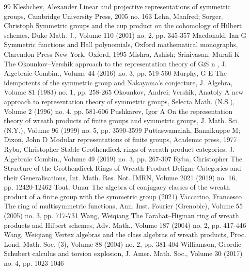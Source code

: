 \documentclass[10pt]{article}
\theoremstyle{definition}
\begin{document}
\begin{thebibliography}{99}
Kleshchev, Alexander Linear and projective representations of symmetric groups, Cambridge University Press, 2005 no. 163
Lehn, Manfred; Sorger, Christoph Symmetric groups and the cup product on the cohomology of Hilbert schemes, Duke Math. J., Volume 110 (2001) no. 2, pp. 345-357
Macdonald, Ian G Symmetric functions and Hall polynomials, Oxford mathematical monographs, Clarendon Press New York, Oxford, 1995
Mishra, Ashish; Srinivasan, Murali K The Okounkov–Vershik approach to the representation theory of G\(\wr\)S n , J. Algebraic Combin., Volume 44 (2016) no. 3, pp. 519-560
Murphy, G E The idempotents of the symmetric group and Nakayama’s conjecture, J. Algebra, Volume 81 (1983) no. 1, pp. 258-265
Okounkov, Andrei; Vershik, Anatoly A new approach to representation theory of symmetric groups, Selecta Math. (N.S.), Volume 2 (1996) no. 4, pp. 581-606
Pushkarev, Igor A On the representation theory of wreath products of finite groups and symmetric groups, J. Math. Sci. (N.Y.), Volume 96 (1999) no. 5, pp. 3590-3599
Puttaswamaiah, Bannikuppe M; Dixon, John D Modular representations of finite groups, Academic press, 1977
Ryba, Christopher Stable Grothendieck rings of wreath product categories, J. Algebraic Combin., Volume 49 (2019) no. 3, pp. 267-307
Ryba, Christopher The Structure of the Grothendieck Rings of Wreath Product Deligne Categories and their Generalisations, Int. Math. Res. Not. IMRN, Volume 2021 (2019) no. 16, pp. 12420-12462
Tout, Omar The algebra of conjugacy classes of the wreath product of a finite group with the symmetric group (2021)
Vaccarino, Francesco The ring of multisymmetric functions, Ann. Inst. Fourier (Grenoble), Volume 55 (2005) no. 3, pp. 717-731
Wang, Weiqiang The Farahat–Higman ring of wreath products and Hilbert schemes, Adv. Math., Volume 187 (2004) no. 2, pp. 417-446
Wang, Weiqiang Vertex algebras and the class algebras of wreath products, Proc. Lond. Math. Soc. (3), Volume 88 (2004) no. 2, pp. 381-404
Williamson, Geordie Schubert calculus and torsion explosion, J. Amer. Math. Soc., Volume 30 (2017) no. 4, pp. 1023-1046
\end{thebibliography}
\end{document}
